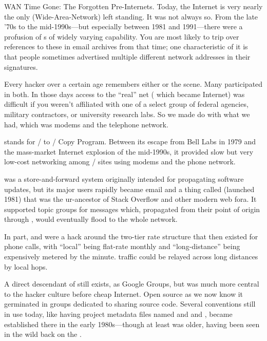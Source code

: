 \sect WAN Time Gone: The Forgotten Pre-Internets.
Today, the  Internet is very nearly the only  (Wide-Area-Network) left
standing. It was not always so. From the late '70s to the mid-1990s---but
especially between 1981 and 1991---there were a profusion of s of widely
varying capability. You are most likely to trip over references to these in
email archives from that time; one characteristic of it is that people
sometimes advertised multiple different network addresses in their signatures.

Every hacker over a certain age remembers either  or the  scene. Many
participated in both. In those days access to the ``real'' net ( which
became Internet) was difficult if you weren't affiliated with one of a select
group of federal agencies, military contractors, or university research labs.
So we made do with what we had, which was modems and the telephone network.

 stands for \UNIX/ to \UNIX/ Copy Program. Between its escape from Bell Labs in
1979 and the mass-market Internet explosion of the mid-1990s, it provided slow
but very low-cost networking among \UNIX/ sites using modems and the phone
network.

 was a store-and-forward system originally intended for propagating
software updates, but its major users rapidly became email and a thing called
 (launched 1981) that was the ur-ancestor of Stack Overflow and other
modern web fora. It supported topic groups for messages which, propagated from
their point of origin through , would eventually flood to the whole
network.

In part,  and  were a hack around the two-tier rate structure that
then existed for phone calls, with ``local'' being flat-rate monthly and
``long-distance'' being expensively metered by the minute.  traffic could be
relayed across long distances by local hops.

A direct descendant of  still exists, as Google Groups, but was much
more central to the hacker culture before cheap Internet. Open source as we now
know it germinated in  groups dedicated to sharing source code. Several
conventions still in use today, like having project metadata files named 
and  and , became established there in the early 1980s---though at
least  was older, having been seen in the wild back on the .

